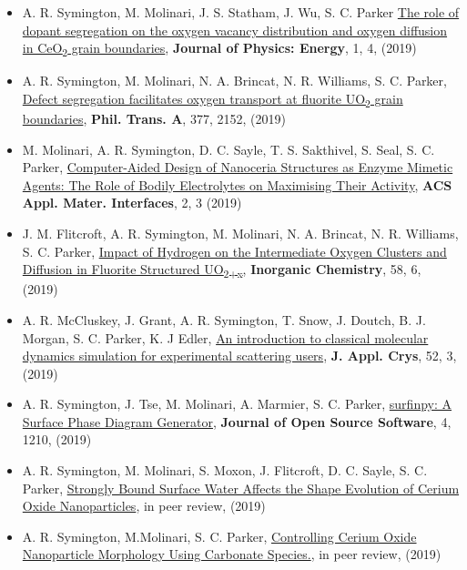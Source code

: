	\begin{itemize}
		\item{A. R. Symington, M. Molinari, J. S. Statham, J. Wu, S. C. Parker  \underline{The role of dopant segregation on the oxygen vacancy distribution and oxygen diffusion in CeO\textsubscript{2} grain boundaries}, \textbf{Journal of Physics: Energy}, 1, 4, (2019)}
		\item{A. R. Symington, M. Molinari, N. A. Brincat, N. R. Williams, S. C. Parker, \underline{Defect segregation facilitates oxygen transport at fluorite UO\textsubscript{2} grain boundaries}, \textbf{Phil. Trans. A}, 377, 2152, (2019)}
		\item{M. Molinari, A. R. Symington, D. C. Sayle, T. S. Sakthivel, S. Seal, S. C. Parker, \underline{Computer-Aided Design of Nanoceria Structures as Enzyme Mimetic Agents: The Role of Bodily Electrolytes on Maximising Their Activity}, \textbf{ACS Appl. Mater. Interfaces}, 2, 3 (2019)}
		\item{J. M. Flitcroft, A. R. Symington, M. Molinari, N. A. Brincat, N. R. Williams, S. C. Parker, \underline{Impact of Hydrogen on the Intermediate Oxygen Clusters and Diffusion in Fluorite Structured UO\textsubscript{2+x}}, \textbf{Inorganic Chemistry}, 58, 6, (2019)}
		\item{A. R. McCluskey, J. Grant, A. R. Symington, T. Snow, J. Doutch, B. J. Morgan, S. C. Parker, K. J Edler, \underline{An introduction to classical molecular dynamics simulation for experimental scattering users}, \textbf{J. Appl. Crys}, 52, 3, (2019)}
		\item{A. R. Symington, J. Tse, M. Molinari, A. Marmier, S. C. Parker, \underline{surfinpy: A Surface Phase Diagram Generator}, \textbf{Journal of Open Source Software}, 4, 1210, (2019)}
		\item{A. R. Symington, M. Molinari, S. Moxon, J. Flitcroft, D. C. Sayle, S. C. Parker, \underline{Strongly Bound Surface Water Affects the Shape Evolution of Cerium Oxide Nanoparticles}, in peer review, (2019)}
		\item{A. R. Symington, M.Molinari, S. C. Parker, \underline{Controlling Cerium Oxide Nanoparticle Morphology Using Carbonate Species.}, in peer review, (2019)}
	\end{itemize}

